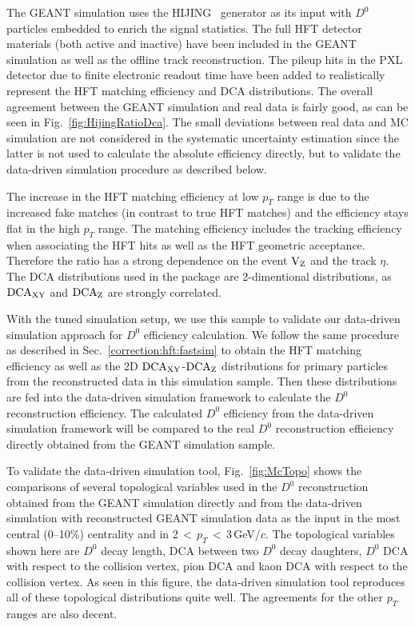 \documentclass[%
 reprint,	
 amsmath,amssymb,
 aps,
 prc,
]{revtex4-1}
\begin{document}
The GEANT simulation uses the HIJING~\cite{HIJING} generator as its input with $D^0$ particles embedded to enrich the signal statistics. The full HFT detector materials (both active and inactive) have been included in the GEANT simulation as well as the offline track reconstruction. The pileup hits in the PXL detector due to finite electronic readout time have been added to realistically represent the HFT matching efficiency and DCA distributions. The overall agreement between the GEANT simulation and real data is fairly good, as can be seen in Fig.~\ref{fig:HijingRatioDca}. The small deviations between real data and MC simulation are not considered in the systematic uncertainty estimation since the latter is not used to calculate the absolute efficiency directly, but to validate the data-driven simulation procedure as described below.

The increase in the HFT matching efficiency at low $p_{T}$ range is due to the increased fake matches (in contrast to true HFT matches) and the efficiency stays flat in the high $p_{T}$ range. The matching efficiency includes the tracking efficiency when associating the HFT hits as well as the HFT geometric acceptance. Therefore the ratio has a strong dependence on the event $\textup{V}_\textup{Z}$ and the track $\eta$. The DCA distributions used in the package are 2-dimentional distributions, as $\textup{DCA}_{\textup{XY}}$ and $\textup{DCA}_\textup{Z}$ are strongly correlated.


With the tuned simulation setup, we use this sample to validate our data-driven simulation approach for $D^0$ efficiency calculation. We follow the same procedure as described in Sec.~\ref{correction:hft:fastsim} to obtain the HFT matching efficiency as well as the 2D $\textup{DCA}_\textup{XY}$-$\textup{DCA}_\textup{Z}$ distributions for primary particles from the reconstructed data in this simulation sample. Then these distributions are fed into the data-driven simulation framework to calculate the $D^0$ reconstruction efficiency. The calculated $D^0$ efficiency from the data-driven simulation framework will be compared to the real $D^0$ reconstruction efficiency directly obtained from the GEANT simulation sample.


To validate the data-driven simulation tool, Fig.~\ref{fig:McTopo} shows the comparisons of several topological variables used in the $D^0$ reconstruction obtained from the GEANT simulation directly and from the data-driven simulation with reconstructed GEANT simulation data as the input in the most central (0--10\%) centrality and in 2\,$<$\,$p_{T}$\,$<$\,3\,GeV/$c$. The topological variables shown here are $D^0$ decay length, DCA between two $D^0$ decay daughters, $D^0$ DCA with respect to the collision vertex, pion DCA and kaon DCA with respect to the collision vertex. As seen in this figure, the data-driven simulation tool reproduces all of these topological distributions quite well. The agreements for the other $p_{T}$ ranges are also decent.
\end{document}
